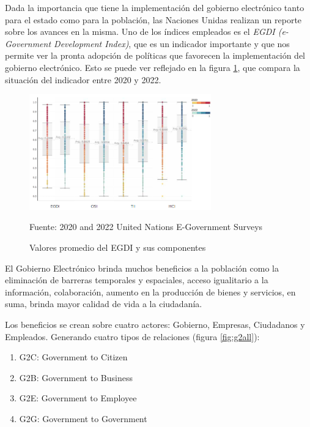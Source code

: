 Dada la importancia que tiene la implementación del gobierno electrónico tanto
para el estado como para la población, las Naciones Unidas realizan un reporte
sobre los avances en la misma. Uno de los índices empleados es el \textit{EGDI
    (e-Government Development Index)}, que es un indicador importante y que nos
permite ver la pronta adopción de políticas que favorecen la implementación del
gobierno electrónico. Esto se puede ver reflejado en la figura
\ref{fig:egdi2020_2022}, que compara la situación del indicador entre 2020 y
2022.

\begin{figure}[!htpb]
    \centering
    \includegraphics[width=0.7\textwidth]{assets/egdi2020_2022}
    \caption{Valores promedio del EGDI y sus componentes}{Fuente: 2020 and 2022
        United Nations E-Government Surveys}
    \label{fig:egdi2020_2022}
\end{figure}

El Gobierno Electrónico brinda muchos beneficios a la población como la
eliminación de barreras temporales y espaciales, acceso igualitario a la
información, colaboración, aumento en la producción de bienes y servicios, en
suma, brinda mayor calidad de vida a la ciudadanía.

Los beneficios se crean sobre cuatro actores: Gobierno, Empresas, Ciudadanos y
Empleados. Generando cuatro tipos de relaciones (figura \ref{fig:g2all}):

\begin{enumerate}
    \item G2C: Government to Citizen
    \item G2B: Government to Business
    \item G2E: Government to Employee
    \item G2G: Government to Government
\end{enumerate}

